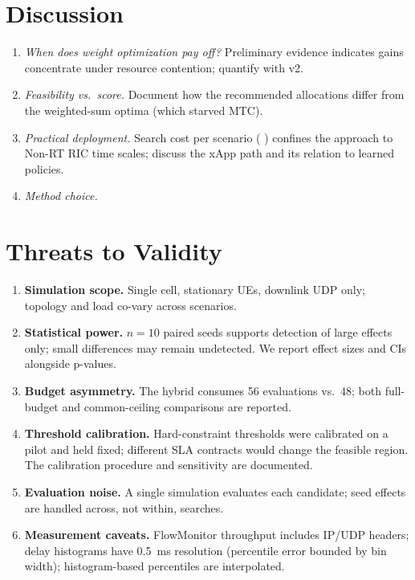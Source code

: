\documentclass[conference]{IEEEtran}
\newif\ifdraftpending
\newcommand{\pending}[1]{%
  \ifdraftpending{\color{red}\textbf{[PENDING-v2: #1]}}\else{}\fi}
\begin{document}
\section{Discussion}
\pending{rewrite around actual findings. Anchor points:}
\begin{enumerate}
\item \emph{When does weight optimization pay off?} Preliminary evidence
indicates gains concentrate under resource contention; quantify with v2.
\item \emph{Feasibility vs.\ score.} Document how the recommended allocations
differ from the weighted-sum optima (which starved MTC).
\item \emph{Practical deployment.} Search cost per scenario
(\pending{CPU-hours}) confines the approach to Non-RT RIC time scales; discuss
the xApp path and its relation to learned policies.
\item \emph{Method choice.} \pending{whether any method is statistically
distinguishable at $n{=}10$; if not, say so plainly---a negative result with
adequate testing is publishable and honest.}
\end{enumerate}

\section{Threats to Validity}
\begin{enumerate}
\item \textbf{Simulation scope.} Single cell, stationary UEs, downlink UDP
only; topology and load co-vary across scenarios.
\item \textbf{Statistical power.} $n = 10$ paired seeds supports detection of
large effects only; small differences may remain undetected. We report effect
sizes and CIs alongside p-values.
\item \textbf{Budget asymmetry.} The hybrid consumes 56 evaluations vs.\ 48;
both full-budget and common-ceiling comparisons are reported.
\item \textbf{Threshold calibration.} Hard-constraint thresholds were
calibrated on a pilot and held fixed; different SLA contracts would change the
feasible region. The calibration procedure and sensitivity are documented.
\item \textbf{Evaluation noise.} A single simulation evaluates each candidate;
seed effects are handled across, not within, searches.
\pending{report any evaluation timeouts/crashes and their hard-penalty handling.}
\item \textbf{Measurement caveats.} FlowMonitor throughput includes IP/UDP
headers; delay histograms have 0.5~ms resolution (percentile error bounded by
bin width); histogram-based percentiles are interpolated.
\end{enumerate}
\end{document}
